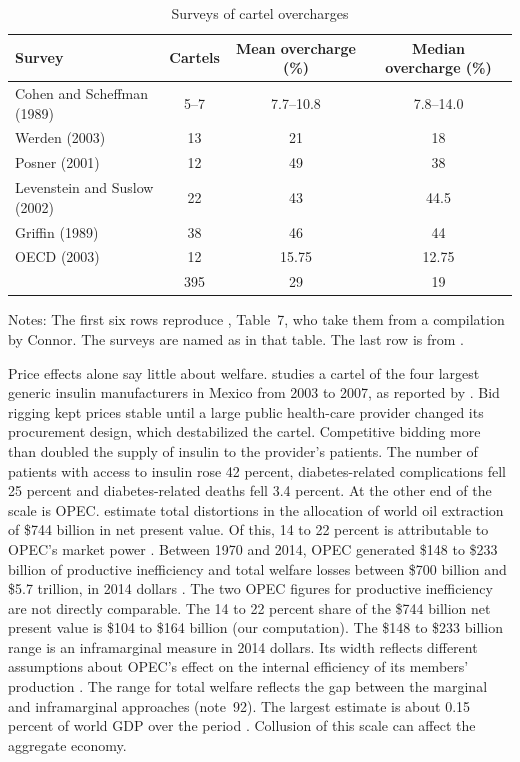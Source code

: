 \begin{table}[htbp]
\centering
\caption{Surveys of cartel overcharges}\label{tab:13-overcharge-surveys}
\small
\begin{tabular}{@{}lccc@{}}
\toprule
Survey & Cartels & Mean overcharge (\%) & Median overcharge (\%)\\
\midrule
Cohen and Scheffman (1989) & 5--7 & 7.7--10.8 & 7.8--14.0\\
Werden (2003) & 13 & 21 & 18\\
Posner (2001) & 12 & 49 & 38\\
Levenstein and Suslow (2002) & 22 & 43 & 44.5\\
Griffin (1989) & 38 & 46 & 44\\
OECD (2003) & 12 & 15.75 & 12.75\\
\addlinespace
\citet{ConnorBolotova2006} & 395 & 29 & 19\\
\bottomrule
\end{tabular}

\smallskip
\begin{minipage}{0.86\textwidth}\footnotesize
Notes: The first six rows reproduce \citet{ErutkuHildebrand2010}, Table~7, who take them from a compilation by
Connor. The surveys are named as in that table. The last row is from \citet[p.~215]{AskerNocke2021}.
\end{minipage}
\end{table}

Price effects alone say little about welfare. \citet{Barkley2020} studies a cartel of the four largest generic
insulin manufacturers in Mexico from 2003 to 2007, as reported by \citet[p.~215]{AskerNocke2021}. Bid rigging kept
prices stable until a large public health-care provider changed its procurement design, which destabilized the
cartel. Competitive bidding more than doubled the supply of insulin to the provider's patients. The number of
patients with access to insulin rose 42 percent, diabetes-related complications fell 25 percent and
diabetes-related deaths fell 3.4 percent. At the other end of the scale is OPEC.
\citet{AskerCollardWexlerDeLoecker2019} estimate total distortions in the allocation of world oil extraction of
\$744 billion in net present value. Of this, 14 to 22 percent is attributable to OPEC's market power
\citep[p.~214]{AskerNocke2021}.
Between 1970 and 2014, OPEC generated \$148 to \$233 billion of productive inefficiency and total welfare losses
between \$700 billion and \$5.7 trillion, in 2014 dollars \citep{AskerCollardWexlerDeLoecker2019,
AskerCollardWexlerDeLoecker2021}. The two OPEC figures for productive inefficiency are not directly comparable.
The 14 to 22 percent share of the \$744 billion net present value is \$104 to \$164 billion (our computation).
The \$148 to \$233 billion range is an inframarginal measure in 2014 dollars. Its width reflects different
assumptions about OPEC's effect on the internal efficiency of its members' production \citep[p.~215,
note~92]{AskerNocke2021}. The range for total welfare reflects the gap between the marginal and inframarginal
approaches (note~92). The largest estimate is about 0.15 percent of world GDP over the period
\citep[pp.~215--216]{AskerNocke2021}. Collusion of this scale can affect the aggregate economy.

